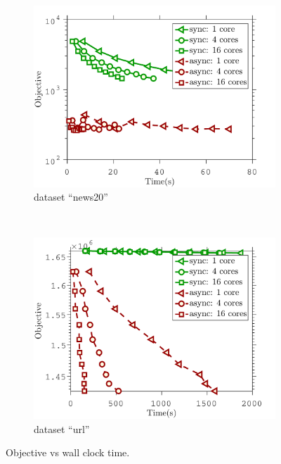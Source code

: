 \begin{figure}[!h]
        \centering
       \begin{subfigure}[b]{0.4\textwidth}
                \includegraphics[width=\textwidth]{./figs/news20_obj}
                \caption{dataset ``news20''}
        \end{subfigure}
        ~~
        \begin{subfigure}[b]{0.4\textwidth}
                \includegraphics[width=\textwidth]{./figs/url_obj}
                \caption{dataset ``url''}
        \end{subfigure} 
        \caption{Objective vs wall clock time.}\label{fig:log_reg_obj}
\end{figure}
